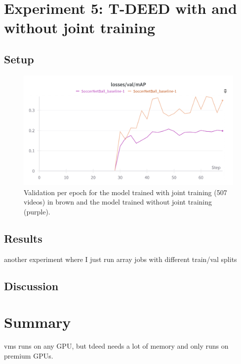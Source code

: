 \section{Experiment 5: T-DEED with and without joint training}
\subsection{Setup}
\label{ssec:ex5_setup}
\begin{figure}
    \centering
    \includegraphics[width=0.75\linewidth]{figures/500_7_val_compare.png}
    \caption{Validation per epoch for the model trained with joint training (507 videos) in brown and the model trained without joint training (purple).}
    \label{fig:500_7_val_compare}
\end{figure}


\subsection{Results}
\label{ssec:ex5_results}


another experiment where I just run array jobs with different train/val splits

\subsection{Discussion}
\label{ssec:ex5_discussion}


\section{Summary}
vms runs on any GPU, but tdeed needs a lot of memory and only runs on premium GPUs.